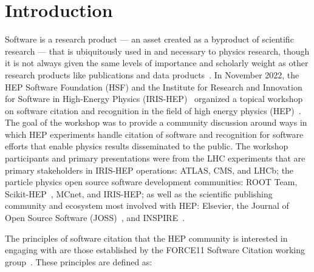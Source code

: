 \section{Introduction}\label{sec:introduction}
Software is a research product --- an asset created as a byproduct of scientific research --- that is ubiquitously used in and necessary to physics research, though it is not always given the same levels of importance and scholarly weight as other research products like publications and data products~\cite{Cranmer:2021urp}.
In November 2022, the HEP Software Foundation (HSF) and the Institute for Research and Innovation for Software in High-Energy Physics (IRIS-HEP)~\cite{S2I2HEPSP,IRISHEPWEB} organized a topical workshop on software citation and recognition in the field of high energy physics (HEP)~\cite{software_citation_workshop_report,software_citation_indico}.
The goal of the workshop was to provide a community discussion around ways in which HEP experiments handle citation of software and recognition for software efforts that enable physics results disseminated to the public.
The workshop participants and primary presentations were from the LHC experiments that are primary stakeholders in IRIS-HEP operations: ATLAS, CMS, and LHCb; the particle physics open source software development communities: ROOT Team, Scikit-HEP~\cite{Rodrigues:2020syo}, MCnet, and IRIS-HEP; as well as the scientific publishing community and ecosystem most involved with HEP: Elsevier, the Journal of Open Source Software (JOSS)~\cite{smith_journal_2018}, and INSPIRE~\cite{INSPIRE}.

The principles of software citation that the HEP community is interested in engaging with are those established by the FORCE11 Software Citation working group~\cite{smith_software_2016}.
These principles are defined as:

